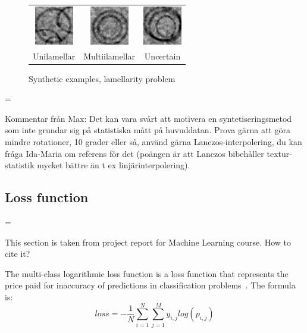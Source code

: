 \documentclass[a4paper, 11pt, table]{article}
\newenvironment{warning}
  {\par\begin{mdframed}[linewidth=2pt,linecolor=red]%
    \begin{list}{}{\leftmargin=1cm
                   \labelwidth=\leftmargin}\item[\Large\ding{43}]}
  {\end{list}\end{mdframed}\par}
\begin{document}
\begin{figure}[H]
\centering
\begin{tabular}{ccc}
	\includegraphics[scale=1.5]{synthetic/uni.png} & \includegraphics[scale=1.5]{synthetic/multi.png} & \includegraphics[scale=1.5]{synthetic/uncertain.png} \\
	Unilamellar & Multiilamellar & Uncertain \\[6pt]
\end{tabular}
\caption{Synthetic examples, lamellarity problem}
\end{figure}

\begin{warning}
Kommentar från Max: Det kan vara svårt att motivera en syntetiseringsmetod som inte grundar sig på statistiska mått på huvuddatan. Prova gärna att göra mindre rotationer, 10 grader eller så, använd gärna Lanczos-interpolering, du kan fråga Ida-Maria om referens för det (poängen är att Lanczos bibehåller textur-statistik mycket bättre än t ex linjärinterpolering).
\end{warning} 

\subsection{Loss function}

\begin{warning}
This section is taken from project report for Machine Learning course. How to cite it?
\end{warning}

The multi-class logarithmic loss function is a loss function that represents the price paid for inaccuracy of predictions in classification problems~\cite{rosasco}. The formula is:
\begin{equation}
loss = -\frac{1}{N} \sum_{i=1}^{N} \sum_{j=1}^{M} y_{i,j} log(p_{i,j})
\end{equation}
\end{document}
